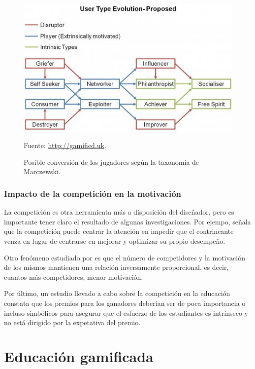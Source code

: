 \begin{figure}[hbtp]
\begin{center}
\includegraphics[scale=0.65]{img/evolution.jpg}
\caption{Posible conversión de los jugadores según la taxonomía de Marczewski.}
\label{fig::MarczewskiEvol}
\vspace{-0.25cm}
\small{Fuente: \url{http://gamified.uk}.}
\end{center}
\end{figure}
\FloatBarrier



\subsubsection{Impacto de la competición en la motivación}


La competición es otra herramienta más a disposición del diseñador, pero es importante tener claro el resultado de algunas investigaciones.
%
Por ejempo, \cite{Crawford_CompetitionDef} señala que la competición puede centrar la atención en impedir que el contrincante venza en lugar de centrarse en mejorar y optimizar su propio desempeño.

Otro fenómeno estudiado por \cite{n-effect} es que el número de competidores y la motivación de los mismos mantienen una relación inversamente proporcional, es decir, cuantos más competidores, menor motivación.

Por último, un estudio llevado a cabo sobre la competición en la educación \cite{CompetitionInEd} constata que los premios para los ganadores deberían ser de poca importancia o incluso simbólicos para asegurar que el esfuerzo de los estudiantes es intrínseco y no está dirigido por la expetativa del premio.


\section{Educación gamificada}

